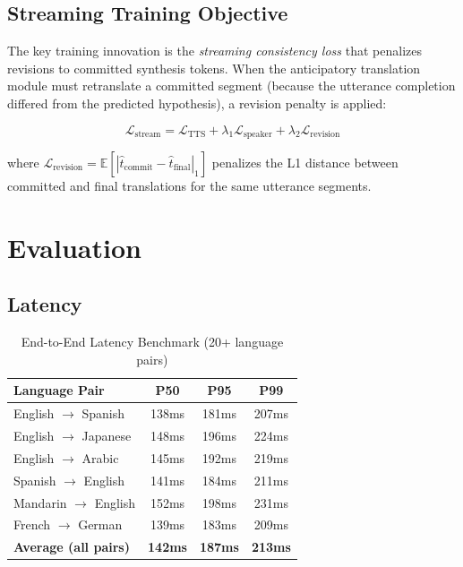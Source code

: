 \documentclass[11pt,a4paper]{article}
\begin{document}
\subsection{Streaming Training Objective}

The key training innovation is the \emph{streaming consistency loss} that penalizes revisions to committed synthesis tokens. When the anticipatory translation module must retranslate a committed segment (because the utterance completion differed from the predicted hypothesis), a revision penalty is applied:

\begin{equation}
  \mathcal{L}_{\text{stream}} = \mathcal{L}_{\text{TTS}} + \lambda_1 \mathcal{L}_{\text{speaker}} + \lambda_2 \mathcal{L}_{\text{revision}}
\end{equation}

where $\mathcal{L}_{\text{revision}} = \mathbb{E}[|\hat{t}_{\text{commit}} - \hat{t}_{\text{final}}|_1]$ penalizes the L1 distance between committed and final translations for the same utterance segments.

\section{Evaluation}

\subsection{Latency}

\begin{table}[H]
\centering
\caption{End-to-End Latency Benchmark (20+ language pairs)}
\begin{tabular}{lccc}
\toprule
\textbf{Language Pair} & \textbf{P50} & \textbf{P95} & \textbf{P99} \\
\midrule
English $\to$ Spanish & 138ms & 181ms & 207ms \\
English $\to$ Japanese & 148ms & 196ms & 224ms \\
English $\to$ Arabic & 145ms & 192ms & 219ms \\
Spanish $\to$ English & 141ms & 184ms & 211ms \\
Mandarin $\to$ English & 152ms & 198ms & 231ms \\
French $\to$ German & 139ms & 183ms & 209ms \\
\textbf{Average (all pairs)} & \textbf{142ms} & \textbf{187ms} & \textbf{213ms} \\
\bottomrule
\end{tabular}
\end{table}
\end{document}
